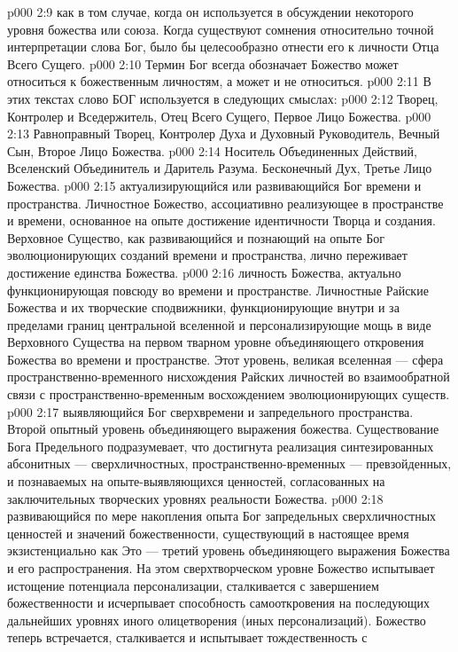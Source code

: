 \vs p000 2:9  как в том случае, когда он используется в обсуждении некоторого уровня божества или союза. Когда существуют сомнения относительно точной интерпретации слова Бог, было бы целесообразно отнести его к личности Отца Всего Сущего.
\vs p000 2:10 \pc Термин Бог всегда обозначает  Божество может относиться к божественным личностям, а может и не относиться.
\vs p000 2:11 \pc В этих текстах слово БОГ используется в следующих смыслах:
\vs p000 2:12 \bibnobreakspace {} Творец, Контролер и Вседержитель, Отец Всего Сущего, Первое Лицо Божества.
\vs p000 2:13 \bibnobreakspace {} Равноправный Творец, Контролер Духа и Духовный Руководитель, Вечный Сын, Второе Лицо Божества.
\vs p000 2:14 \bibnobreakspace {} Носитель Объединенных Действий, Вселенский Объединитель и Даритель Разума. Бесконечный Дух, Третье Лицо Божества.
\vs p000 2:15 \bibnobreakspace {} актуализирующийся или развивающийся Бог времени и пространства. Личностное Божество, ассоциативно реализующее в пространстве и времени, основанное на опыте достижение идентичности Творца и создания. Верховное Существо, как развивающийся и познающий на опыте Бог эволюционирующих созданий времени и пространства, лично переживает достижение единства Божества.
\vs p000 2:16 \bibnobreakspace {} личность Божества, актуально функционирующая повсюду во времени и пространстве. Личностные Райские Божества и их творческие сподвижники, функционирующие внутри и за пределами границ центральной вселенной и персонализирующие мощь в виде Верховного Существа на первом тварном уровне объединяющего откровения Божества во времени и пространстве. Этот уровень, великая вселенная --- сфера пространственно\hyp{}временного нисхождения Райских личностей во взаимообратной связи с пространственно\hyp{}временным восхождением эволюционирующих существ.
\vs p000 2:17 \bibnobreakspace {} выявляющийся Бог сверхвремени и запредельного пространства. Второй опытный уровень объединяющего выражения божества. Существование Бога Предельного подразумевает, что достигнута реализация синтезированных абсонитных --- сверхличностных, пространственно\hyp{}временных --- превзойденных, и познаваемых на опыте\hyp{}выявляющихся ценностей, согласованных на заключительных творческих уровнях реальности Божества.
\vs p000 2:18 \bibnobreakspace {} развивающийся по мере накопления опыта Бог запредельных сверхличностных ценностей и значений божественности, существующий в настоящее время экзистенциально как  Это --- третий уровень объединяющего выражения Божества и его распространения. На этом сверхтворческом уровне Божество испытывает истощение потенциала персонализации, сталкивается с завершением божественности и исчерпывает способность самооткровения на последующих дальнейших уровнях иного олицетворения (иных персонализаций). Божество теперь встречается, сталкивается и испытывает тождественность с 
